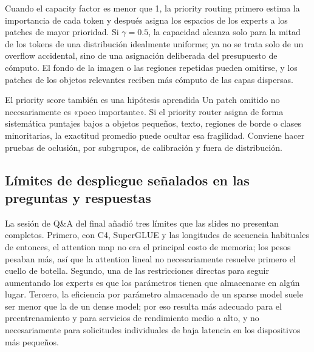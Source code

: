 Cuando el capacity factor es menor que 1, la priority routing primero estima la importancia de cada token y después asigna los espacios de los experts a los patches de mayor prioridad. Si $\gamma=0.5$, la capacidad alcanza solo para la mitad de los tokens de una distribución idealmente uniforme; ya no se trata solo de un overflow accidental, sino de una asignación deliberada del presupuesto de cómputo. El fondo de la imagen o las regiones repetidas pueden omitirse, y los patches de los objetos relevantes reciben más cómputo de las capas dispersas.



\begin{warningbox}{El priority score también es una hipótesis aprendida}
Un patch omitido no necesariamente es «poco importante». Si el priority router asigna de forma sistemática puntajes bajos a objetos pequeños, texto, regiones de borde o clases minoritarias, la exactitud promedio puede ocultar esa fragilidad. Conviene hacer pruebas de oclusión, por subgrupos, de calibración y fuera de distribución.
\end{warningbox}

\subsection{Límites de despliegue señalados en las preguntas y respuestas}

La sesión de Q\&A del final añadió tres límites que las slides no presentan completos. Primero, con C4, SuperGLUE y las longitudes de secuencia habituales de entonces, el attention map no era el principal costo de memoria; los pesos pesaban más, así que la attention lineal no necesariamente resuelve primero el cuello de botella. Segundo, una de las restricciones directas para seguir aumentando los experts es que los parámetros tienen que almacenarse en algún lugar. Tercero, la eficiencia por parámetro almacenado de un sparse model suele ser menor que la de un dense model; por eso resulta más adecuado para el preentrenamiento y para servicios de rendimiento medio a alto, y no necesariamente para solicitudes individuales de baja latencia en los dispositivos más pequeños.

